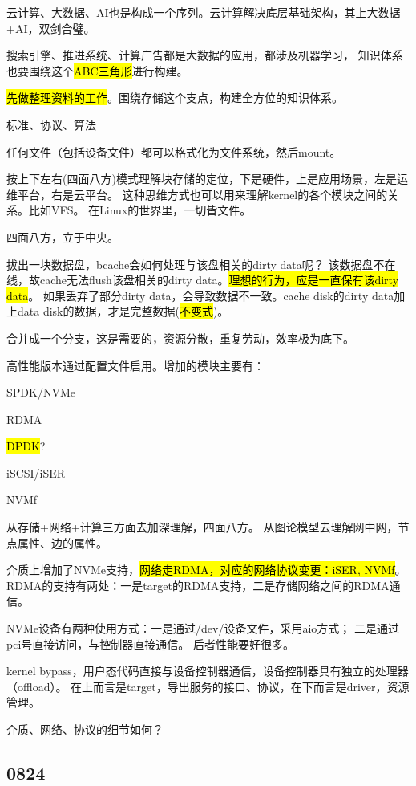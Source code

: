 云计算、大数据、AI也是构成一个序列。云计算解决底层基础架构，其上大数据+AI，双剑合璧。

搜索引擎、推进系统、计算广告都是大数据的应用，都涉及机器学习，
知识体系也要围绕这个\hl{ABC三角形}进行构建。

\hl{先做整理资料的工作}。围绕存储这个支点，构建全方位的知识体系。

标准、协议、算法

任何文件（包括设备文件）都可以格式化为文件系统，然后mount。

按上下左右(四面八方)模式理解块存储的定位，下是硬件，上是应用场景，左是运维平台，右是云平台。
这种思维方式也可以用来理解kernel的各个模块之间的关系。比如VFS。
在Linux的世界里，一切皆文件。

四面八方，立于中央。

拔出一块数据盘，bcache会如何处理与该盘相关的dirty data呢？
该数据盘不在线，故cache无法flush该盘相关的dirty data。\hl{理想的行为，应是一直保有该dirty data}。
如果丢弃了部分dirty data，会导致数据不一致。cache disk的dirty data加上data disk的数据，才是完整数据(\hl{不变式})。

合并成一个分支，这是需要的，资源分散，重复劳动，效率极为底下。

高性能版本通过配置文件启用。增加的模块主要有：
\begin{enumbox}
\item SPDK/NVMe
\item RDMA
\item \hl{DPDK}?
\item iSCSI/iSER
\item NVMf
\end{enumbox}

从存储+网络+计算三方面去加深理解，四面八方。
从图论模型去理解网中网，节点属性、边的属性。

介质上增加了NVMe支持，\hl{网络走RDMA，对应的网络协议变更：iSER, NVMf}。
RDMA的支持有两处：一是target的RDMA支持，二是存储网络之间的RDMA通信。

NVMe设备有两种使用方式：一是通过/dev/设备文件，采用aio方式； 二是通过pci号直接访问，与控制器直接通信。
后者性能要好很多。

kernel bypass，用户态代码直接与设备控制器通信，设备控制器具有独立的处理器（offload）。
在上而言是target，导出服务的接口、协议，在下而言是driver，资源管理。

介质、网络、协议的细节如何？

\subsection{0824}

